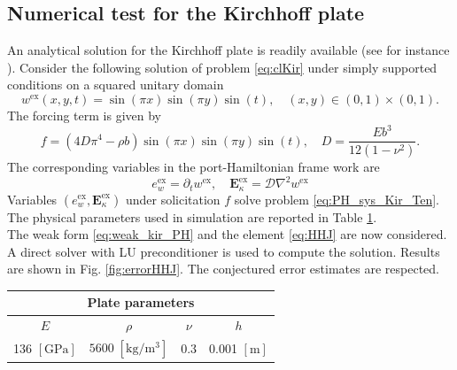\documentclass{ifacconf}
\begin{document}
 
\subsection{Numerical test for the Kirchhoff plate}
An analytical solution for the Kirchhoff plate is readily available (see for instance \cite{reddy2006theory}). Consider the following solution of problem \eqref{eq:clKir} under simply supported conditions on a squared unitary domain
\[
w^{\text{ex}}(x,y,t) = \sin(\pi x) \sin(\pi y) \sin(t), \quad  (x, y) \in (0,1)\times (0,1).
\] 
The forcing term is given by  
\[
f = (4 D \pi^4 - \rho b) \sin(\pi x) \sin(\pi y) \sin(t), \quad D = \frac{E b^3}{12 (1-\nu^2)}.
\]
The corresponding variables in the port-Hamiltonian frame work are
\[
e_w^{\text{ex}} = \partial_t w^{\text{ex}}, \quad \bm{E}_\kappa^{\text{ex}} = \mathcal{D} \nabla^2 w^{\text{ex}}
\]
Variables $(e_w^{\text{ex}}, \bm{E}_\kappa^{\text{ex}})$ under solicitation $f$ solve problem \eqref{eq:PH_sys_Kir_Ten}. The physical parameters used in simulation are reported in Table \ref{tab:parKir}. \\
The weak form \eqref{eq:weak_kir_PH} and the element \eqref{eq:HHJ} are now considered.
A direct solver with LU preconditioner is used to compute the solution. Results are shown in Fig. \ref{fig:errorHHJ}. The conjectured error estimates are respected.


\begin{table}[h]
	\centering
	\begin{tabular}{cccc}
		\hline 
		\multicolumn{4}{c}{Plate parameters} \\ 
		\hline 
		$E$ & $\rho$ & $\nu$  & $h$ \\
		136 $[\textrm{GPa}]$ & $5600\; [\textrm{kg}/\textrm{m}^3]$ & 0.3 &  0.001 $[\textrm{m}]$\\ 
		\hline 
	\end{tabular} 
	\captionsetup{width=0.95\linewidth}
	\vspace{1mm}
	\label{tab:parKir}
\end{table}
\end{document}
